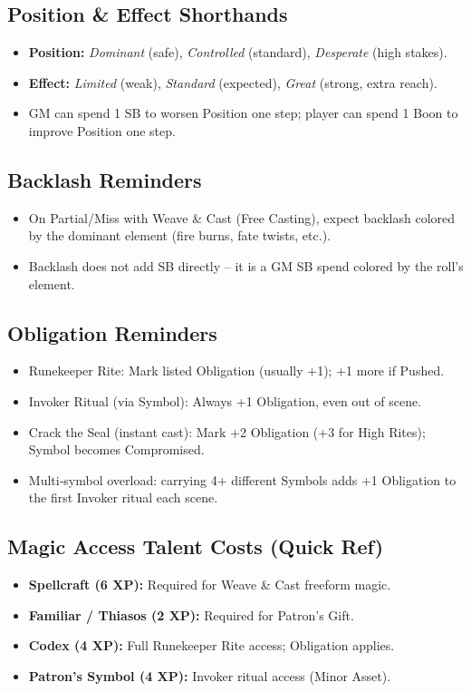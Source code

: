 \subsection{Position \& Effect Shorthands}
\begin{itemize}
  \item \textbf{Position:} \emph{Dominant} (safe), \emph{Controlled} (standard), \emph{Desperate} (high stakes).
  \item \textbf{Effect:} \emph{Limited} (weak), \emph{Standard} (expected), \emph{Great} (strong, extra reach).
  \item GM can spend 1 SB to worsen Position one step; player can spend 1 Boon to improve Position one step.
\end{itemize}

\subsection{Backlash Reminders}
\begin{itemize}
  \item On Partial/Miss with Weave \& Cast (Free Casting), expect backlash colored by the dominant element (fire burns, fate twists, etc.).
  \item Backlash does not add SB directly – it is a GM SB spend colored by the roll’s element.
\end{itemize}

\subsection{Obligation Reminders}
\begin{itemize}
  \item Runekeeper Rite: Mark listed Obligation (usually +1); +1 more if Pushed.
  \item Invoker Ritual (via Symbol): Always +1 Obligation, even out of scene.
  \item Crack the Seal (instant cast): Mark +2 Obligation (+3 for High Rites); Symbol becomes Compromised.
  \item Multi‑symbol overload: carrying 4+ different Symbols adds +1 Obligation to the first Invoker ritual each scene.
\end{itemize}

\subsection{Magic Access Talent Costs (Quick Ref)}
\begin{itemize}
  \item \textbf{Spellcraft (6 XP):} Required for Weave \& Cast freeform magic.
  \item \textbf{Familiar / Thiasos (2 XP):} Required for Patron’s Gift.
  \item \textbf{Codex (4 XP):} Full Runekeeper Rite access; Obligation applies.
  \item \textbf{Patron’s Symbol (4 XP):} Invoker ritual access (Minor Asset).
\end{itemize}

